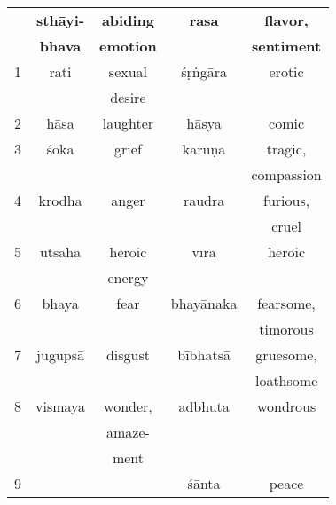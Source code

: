 \documentclass[10pt]{article}
\begin{document}
\setlength{\columnsep}{3em}
\begin{multicols}{2}
	\hspace*{-9mm}
	\begin{tabular}{|c||c|c||c|c|}
		\hline
		  & \textbf{sthāyi-} & \textbf{abiding} & \textbf{rasa} & \textbf{flavor,}   \\
		  & \textbf{bhāva}   & \textbf{emotion} &               & \textbf{sentiment} \\
		\hline
		1 & rati             & sexual           & śṛṅgāra       & erotic             \\
		  &                  & desire           &               &                    \\
		\hline
		2 & hāsa             & laughter         & hāsya         & comic              \\
		\hline
		3 & śoka             & grief            & karuṇa        & tragic,            \\
		  &                  &                  &               & compassion         \\
		\hline
		4 & krodha           & anger            & raudra        & furious,           \\
		  &                  &                  &               & cruel              \\
		\hline
		5 & utsāha           & heroic           & vīra          & heroic             \\
		  &                  & energy           &               &                    \\
		\hline
		6 & bhaya            & fear             & bhayānaka     & fearsome,          \\
		  &                  &                  &               & timorous           \\
		\hline
		7 & jugupsā          & disgust          & bībhatsā      & gruesome,          \\
		  &                  &                  &               & loathsome          \\
		\hline
		8 & vismaya          & wonder,          & adbhuta       & wondrous           \\
		  &                  & amaze-           &               &                    \\
		  &                  & ment             &               &                    \\
		\hline
		9 &                  &                  & śānta         & peace              \\
		\hline
	\end{tabular}


\end{multicols}
\end{document}
